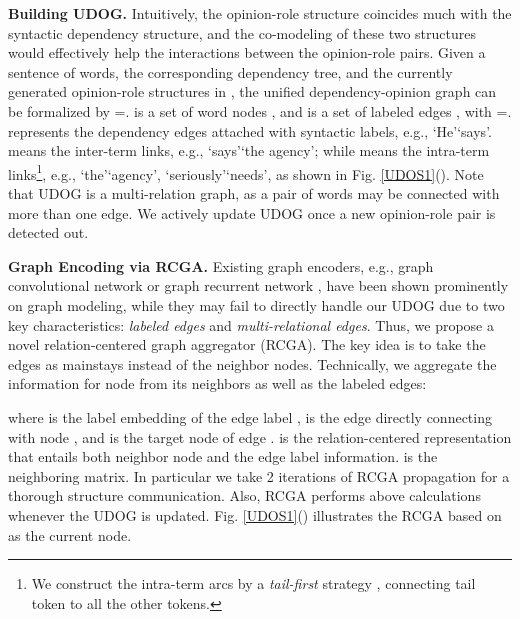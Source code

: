 \documentclass[letterpaper]{article} \usepackage{aaai22}  \usepackage{times}  \usepackage{helvet}  \usepackage{courier}  \usepackage[hyphens]{url}  \usepackage{graphicx} \urlstyle{rm} \def\UrlFont{\rm}  \usepackage{natbib}  \usepackage{caption} \DeclareCaptionStyle{ruled}{labelfont=normalfont,labelsep=colon,strut=off} \frenchspacing  \setlength{\pdfpagewidth}{8.5in}  \setlength{\pdfpageheight}{11in}  \usepackage{algorithm}
\begin{document}
\noindent\textbf{Building UDOG.}
Intuitively, the opinion-role structure coincides much with the syntactic dependency structure, and the co-modeling of these two structures would effectively help the interactions between the opinion-role pairs.
Given a sentence of words, the corresponding dependency tree, and the currently generated opinion-role structures in , the unified dependency-opinion graph can be formalized by =.
 is a set of word nodes , and  is a set of labeled edges , with =.
 represents the dependency edges attached with syntactic labels, e.g., `He'`says'.
 means the inter-term links, e.g., `says'`the agency'; while  means the intra-term links\footnote{We construct the intra-term arcs by a \emph{tail-first} strategy \cite{barnes-etal-2021-structured}, connecting tail token to all the other tokens.}, e.g., `the'`agency', `seriously'`needs', as shown in Fig. \ref{UDOS1}().
Note that UDOG is a multi-relation graph, as a pair of words may be connected with more than one edge.
We actively update UDOG once a new opinion-role pair is detected out.
















\noindent\textbf{Graph Encoding via RCGA.}
Existing graph encoders, e.g., graph convolutional network \cite{marcheggiani-titov-2017-encoding} or graph recurrent network \cite{zhang-zhang-2019-tree}, have been shown prominently on graph modeling, while they may fail to directly handle our UDOG due to two key characteristics: \emph{labeled edges} and \emph{multi-relational edges}.
Thus, we propose a novel relation-centered graph aggregator (RCGA).
The key idea is to take the edges as mainstays instead of the neighbor nodes.
Technically, we aggregate the information for node  from its neighbors as well as the labeled edges:
\setlength\abovedisplayskip{2pt}
\setlength\belowdisplayskip{2pt}

where  is the label embedding of the edge label ,
 is the edge directly connecting with node , 
and  is the target node of edge .
 is the relation-centered representation that entails both neighbor node and the edge label information.
 is the neighboring matrix.
In particular we take 2 iterations of RCGA propagation for a thorough structure communication.
Also, RCGA performs above calculations whenever the UDOG is updated.
Fig. \ref{UDOS1}() illustrates the RCGA based on  as the current node.
\end{document}
